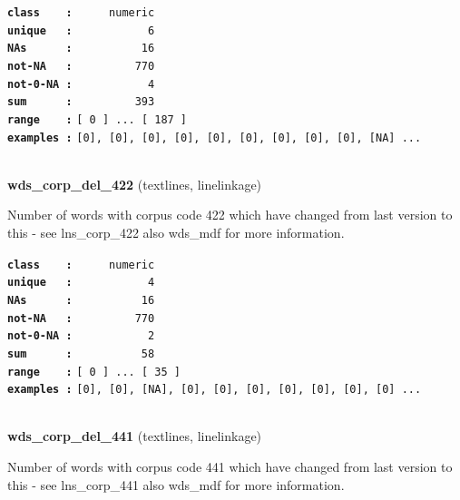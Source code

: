 \documentclass[]{article}
\begin{document}
\textbf{\texttt{class\ \ \ \ :}} \texttt{~~~~~numeric}\\
\textbf{\texttt{unique\ \ \ :}} \texttt{~~~~~~~~~~~6}\\
\textbf{\texttt{NAs\ \ \ \ \ \ :}} \texttt{~~~~~~~~~~16}\\
\textbf{\texttt{not-NA\ \ \ :}} \texttt{~~~~~~~~~770}\\
\textbf{\texttt{not-0-NA\ :}} \texttt{~~~~~~~~~~~4}\\
\textbf{\texttt{sum\ \ \ \ \ \ :}} \texttt{~~~~~~~~~393}\\
\textbf{\texttt{range\ \ \ \ :}}
\texttt{{[}\ 0\ {]}\ ...\ {[}\ 187\ {]}}\\
\textbf{\texttt{examples\ :}}
\texttt{{[}0{]},\ {[}0{]},\ {[}0{]},\ {[}0{]},\ {[}0{]},\ {[}0{]},\ {[}0{]},\ {[}0{]},\ {[}0{]},\ {[}NA{]}\ ...}\\

~

\textbf{wds\_corp\_del\_422} (textlines, linelinkage)

Number of words with corpus code 422 which have changed from last
version to this - see lns\_corp\_422 also wds\_mdf for more information.

\textbf{\texttt{class\ \ \ \ :}} \texttt{~~~~~numeric}\\
\textbf{\texttt{unique\ \ \ :}} \texttt{~~~~~~~~~~~4}\\
\textbf{\texttt{NAs\ \ \ \ \ \ :}} \texttt{~~~~~~~~~~16}\\
\textbf{\texttt{not-NA\ \ \ :}} \texttt{~~~~~~~~~770}\\
\textbf{\texttt{not-0-NA\ :}} \texttt{~~~~~~~~~~~2}\\
\textbf{\texttt{sum\ \ \ \ \ \ :}} \texttt{~~~~~~~~~~58}\\
\textbf{\texttt{range\ \ \ \ :}}
\texttt{{[}\ 0\ {]}\ ...\ {[}\ 35\ {]}}\\
\textbf{\texttt{examples\ :}}
\texttt{{[}0{]},\ {[}0{]},\ {[}NA{]},\ {[}0{]},\ {[}0{]},\ {[}0{]},\ {[}0{]},\ {[}0{]},\ {[}0{]},\ {[}0{]}\ ...}\\

~

\textbf{wds\_corp\_del\_441} (textlines, linelinkage)

Number of words with corpus code 441 which have changed from last
version to this - see lns\_corp\_441 also wds\_mdf for more information.
\end{document}

